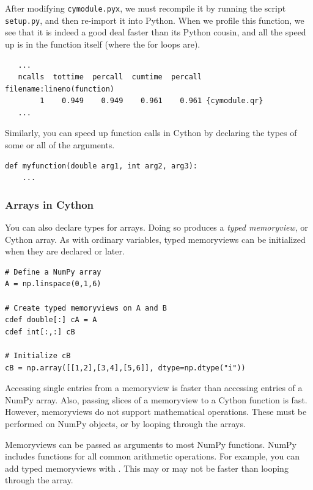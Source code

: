 After modifying \texttt{cymodule.pyx}, we must recompile it by running the script \texttt{setup.py}, and then re-import it into Python.
When we profile this function, we see that it is indeed a good deal faster than its Python cousin, and all the speed up is in the function itself (where the for loops are).
{\scriptsize
\begin{verbatim}
   ...
   ncalls  tottime  percall  cumtime  percall filename:lineno(function)
        1    0.949    0.949    0.961    0.961 {cymodule.qr}
   ...
       \end{verbatim}
       }
Similarly, you can speed up function calls in Cython by declaring the types of some or all of the arguments.
\begin{lstlisting}
def myfunction(double arg1, int arg2, arg3):
    ...
\end{lstlisting}

\subsubsection*{Arrays in Cython}
You can also declare types for arrays.
Doing so produces a \emph{typed memoryview}, or Cython array.
As with ordinary variables, typed memoryviews can be initialized when they are declared or later.
\begin{lstlisting}
# Define a NumPy array
A = np.linspace(0,1,6)

# Create typed memoryviews on A and B
cdef double[:] cA = A
cdef int[:,:] cB

# Initialize cB
cB = np.array([[1,2],[3,4],[5,6]], dtype=np.dtype("i"))
\end{lstlisting}

Accessing single entries from a memoryview is faster than accessing entries of a NumPy array.
Also, passing slices of a memoryview to a Cython function is fast.
However, memoryviews do not support mathematical operations.
These must be performed on NumPy objects, or by looping through the arrays.

\begin{info}
Memoryviews can be passed as arguments to most NumPy functions.
NumPy includes functions for all common arithmetic operations.
For example, you can add typed memoryviews with .
This may or may not be faster than looping through the array.
\end{info}



